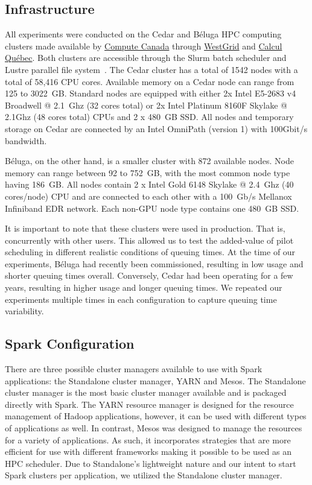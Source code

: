 \documentclass{IEEEtran}
\begin{document}
    \subsection{Infrastructure}
    All experiments were conducted on the Cedar and B\'eluga HPC computing
    clusters made available by \href{https://www.computecanada.ca}{Compute
    Canada} through \href{https://www.westgrid.ca}{WestGrid} and
    \href{http://www.calculquebec.ca}{Calcul Qu\'ebec}. Both clusters are
    accessible through the Slurm batch scheduler and Lustre parallel file
    system~\cite{schwan2003lustre}. The Cedar cluster has a total of 1542
    nodes with a total of 58,416 CPU cores. Available memory on a Cedar
    node can range from 125 to 3022~GB. Standard nodes are equipped with
    either 2x Intel E5-2683 v4 Broadwell @ 2.1~Ghz (32 cores total) or 2x
    Intel Platinum 8160F Skylake @ 2.1Ghz (48 cores total) CPUs and 2 x
    480~GB SSD. All nodes and temporary storage on Cedar are connected by an
    Intel OmniPath (version 1) with 100Gbit/s bandwidth.

    B\'eluga, on the other hand, is a smaller cluster with 872 available
    nodes. Node memory can range between 92 to 752~GB, with the most common
    node type having 186~GB. All nodes contain 2 x Intel Gold 6148 Skylake @
    2.4~Ghz (40 cores/node) CPU and are connected to each other with a
    100~Gb/s Mellanox Infiniband EDR network. Each non-GPU
    node type contains one 480~GB SSD. 

    It is important to note that these clusters were used in production.
    That is, concurrently with other users. This allowed us to test the
    added-value of pilot scheduling in different realistic conditions of queuing
    times. At the time of our experiments, B\'eluga had recently been
    commissioned, resulting in low usage and shorter queuing times overall.
    Conversely, Cedar had been operating for a few years, resulting in
    higher usage and longer queuing times. We repeated our experiments multiple 
    times in each configuration to capture queuing time variability.

    \subsection{Spark Configuration}

    There are three possible cluster managers available to use with Spark applications:
    the Standalone cluster manager, YARN and Mesos. The Standalone cluster manager is the
    most basic cluster manager available and is packaged directly with Spark. The 
    YARN resource manager is designed for the resource management of Hadoop applications, however,
    it can be used with different types of applications as well. In contrast, Mesos was 
    designed to manage the resources for a variety of applications. As such, it incorporates
    strategies that are more efficient for use with different frameworks making it possible
    to be used as an HPC scheduler. Due to Standalone's lightweight nature and our intent
    to start Spark clusters per application, we utilized the Standalone cluster manager.
\end{document}
